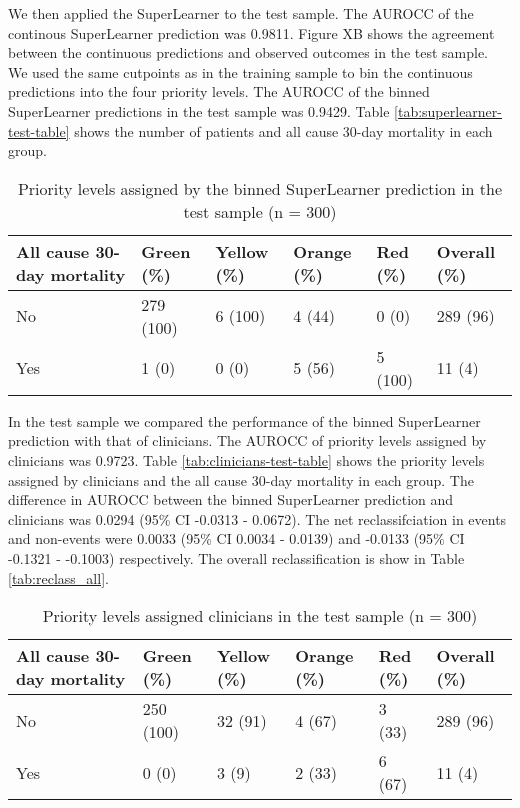 \documentclass[10pt,letterpaper]{article}\usepackage[]{graphicx}\usepackage[]{color}
\begin{document}
We then applied the SuperLearner to the test sample. The AUROCC of the continous
SuperLearner prediction was 0.9811. Figure XB shows
the agreement between the continuous predictions and observed outcomes in the
test sample. We used the same cutpoints as in the training sample to bin the
continuous predictions into the four priority levels. The AUROCC of the binned
SuperLearner predictions in the test sample was
0.9429. Table \ref{tab:superlearner-test-table}
shows the number of patients and all cause 30-day mortality in each group.

\begin{table}[ht]
\centering
\caption{Priority levels assigned by the binned SuperLearner prediction in the test sample (n = 300)} 
\label{tab:superlearner-priorities-test}
\begin{tabular}{llllll}
  \hline
All cause 30-day mortality & Green (\%) & Yellow (\%) & Orange (\%) & Red (\%) & Overall (\%) \\ 
  \hline
No & 279 (100) & 6 (100) & 4 (44) & 0 (0) & 289 (96) \\ 
  Yes & 1 (0) & 0 (0) & 5 (56) & 5 (100) & 11 (4) \\ 
   \hline
\end{tabular}
\end{table}


In the test sample we compared the performance of the binned SuperLearner
prediction with that of clinicians. The AUROCC of priority levels assigned by
clinicians was 0.9723. Table \ref{tab:clinicians-test-table}
shows the priority levels assigned by clinicians and the all cause 30-day
mortality in each group. The difference in AUROCC between the binned
SuperLearner prediction and clinicians was
0.0294 (95\% CI -0.0313 - 0.0672). The net reclassifciation in events and
non-events were 0.0033 (95\% CI 0.0034 - 0.0139) and -0.0133 (95\% CI -0.1321 - -0.1003) respectively. The overall
reclassification is show in Table \ref{tab:reclass_all}.

\begin{table}[ht]
\centering
\caption{Priority levels assigned clinicians in the test sample (n = 300)} 
\label{tab:clinicians-priorities-test}
\begin{tabular}{llllll}
  \hline
All cause 30-day mortality & Green (\%) & Yellow (\%) & Orange (\%) & Red (\%) & Overall (\%) \\ 
  \hline
No & 250 (100) & 32 (91) & 4 (67) & 3 (33) & 289 (96) \\ 
  Yes & 0 (0) & 3 (9) & 2 (33) & 6 (67) & 11 (4) \\ 
   \hline
\end{tabular}
\end{table}
\end{document}
